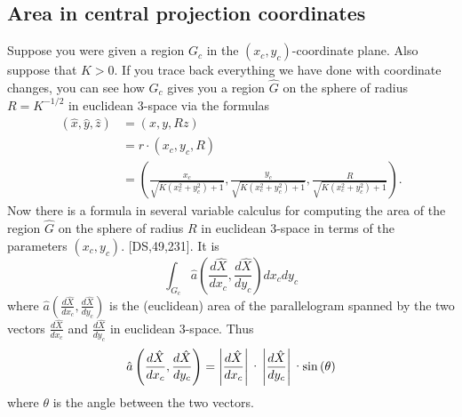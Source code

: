 \documentclass{ximera}
\begin{document}
\subsection*{Area in central projection coordinates}

Suppose you were given a region $G_{c}$ in the $\left(  x_{c},y_{c}\right)
$-coordinate plane. Also suppose that $K>0$. If you trace back everything we
have done with coordinate changes, you can see how $G_{c}$ gives you a region
$\hat{G}$ on the sphere of radius $R=K^{-1/2}$ in euclidean $3$-space via the
formulas%
\begin{align*}
\left(  \hat{x},\hat{y},\hat{z}\right)   &  =\left(  x,y,Rz\right) \\
&  =r\cdot\left(  x_{c},y_{c},R\right) \\
&  =\left(  \frac{x_{c}}{\sqrt{K\left(  x_{c}^{2}+y_{c}^{2}\right)  +1}}%
,\frac{y_{c}}{\sqrt{K\left(  x_{c}^{2}+y_{c}^{2}\right)  +1}},\frac{R}%
{\sqrt{K\left(  x_{c}^{2}+y_{c}^{2}\right)  +1}}\right)  .
\end{align*}
Now there is a formula in several variable calculus for computing the area of
the region $\hat{G}$ on the sphere of radius $R$ in euclidean $3$-space in
terms of the parameters $\left(  x_{c},y_{c}\right)  $. [DS,49,231]. It is
\begin{equation}%
\int_{G_{c}}
\hat{a}\left(  \frac{d\hat{X}}{dx_{c}},\frac{d\hat{X}}{dy_{c}}\right)
dx_{c}dy_{c} \label{68}%
\end{equation}
where $\hat{a}\left(  \frac{d\hat{X}}{dx_{c}},\frac{d\hat{X}}{dy_{c}}\right)
$ is the (euclidean) area of the parallelogram spanned by the two vectors
$\frac{d\hat{X}}{dx_{c}}$ and $\frac{d\hat{X}}{dy_{c}}$ in euclidean
$3$-space. Thus%
\[
\hat{a}\left(  \frac{d\hat{X}}{dx_{c}},\frac{d\hat{X}}{dy_{c}}\right)
=\left\vert \frac{d\hat{X}}{dx_{c}}\right\vert \text{\textperiodcentered
}\left\vert \frac{d\hat{X}}{dy_{c}}\right\vert \text{\textperiodcentered
}\mathrm{sin}\left(  \theta\right)
\]
where $\theta$ is the angle between the two vectors.
\end{document}
